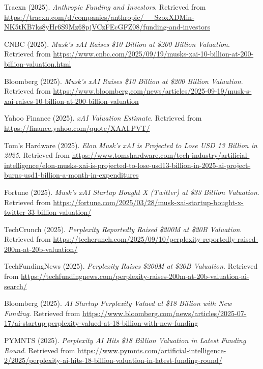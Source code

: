 \documentclass[10pt,a4paper]{article}
\begin{document}
\begin{thebibliography}{99}
Tracxn (2025).
\textit{Anthropic Funding and Investors}.
Retrieved from \url{https://tracxn.com/d/companies/anthropic/__SzoxXDMin-NK5tKB7ks8yHr6S9Mz68pjVCzFEcGFZ08/funding-and-investors}

CNBC (2025).
\textit{Musk's xAI Raises \$10 Billion at \$200 Billion Valuation}.
Retrieved from \url{https://www.cnbc.com/2025/09/19/musks-xai-10-billion-at-200-billion-valuation.html}

Bloomberg (2025).
\textit{Musk's xAI Raises \$10 Billion at \$200 Billion Valuation}.
Retrieved from \url{https://www.bloomberg.com/news/articles/2025-09-19/musk-s-xai-raises-10-billion-at-200-billion-valuation}

Yahoo Finance (2025).
\textit{xAI Valuation Estimate}.
Retrieved from \url{https://finance.yahoo.com/quote/XAAI.PVT/}

Tom's Hardware (2025).
\textit{Elon Musk's xAI is Projected to Lose USD 13 Billion in 2025}.
Retrieved from \url{https://www.tomshardware.com/tech-industry/artificial-intelligence/elon-musks-xai-is-projected-to-lose-usd13-billion-in-2025-ai-project-burns-usd1-billion-a-month-in-expenditures}

Fortune (2025).
\textit{Musk's xAI Startup Bought X (Twitter) at \$33 Billion Valuation}.
Retrieved from \url{https://fortune.com/2025/03/28/musk-xai-startup-bought-x-twitter-33-billion-valuation/}

TechCrunch (2025).
\textit{Perplexity Reportedly Raised \$200M at \$20B Valuation}.
Retrieved from \url{https://techcrunch.com/2025/09/10/perplexity-reportedly-raised-200m-at-20b-valuation/}

TechFundingNews (2025).
\textit{Perplexity Raises \$200M at \$20B Valuation}.
Retrieved from \url{https://techfundingnews.com/perplexity-raises-200m-at-20b-valuation-ai-search/}

Bloomberg (2025).
\textit{AI Startup Perplexity Valued at \$18 Billion with New Funding}.
Retrieved from \url{https://www.bloomberg.com/news/articles/2025-07-17/ai-startup-perplexity-valued-at-18-billion-with-new-funding}

PYMNTS (2025).
\textit{Perplexity AI Hits \$18 Billion Valuation in Latest Funding Round}.
Retrieved from \url{https://www.pymnts.com/artificial-intelligence-2/2025/perplexity-ai-hits-18-billion-valuation-in-latest-funding-round/}


\end{thebibliography}
\end{document}
